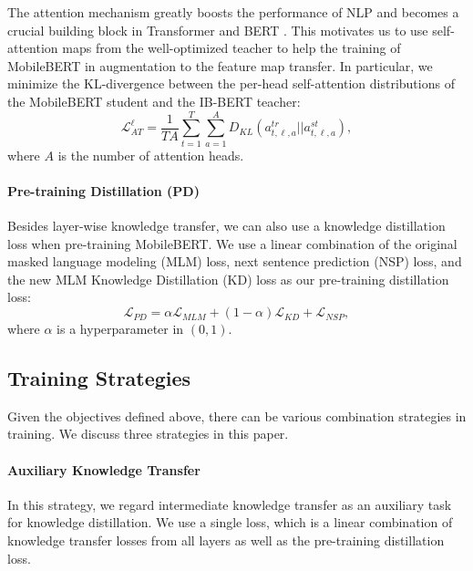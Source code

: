 \documentclass[11pt,a4paper]{article}
\begin{document}
The attention mechanism greatly boosts the performance of NLP and becomes a crucial building block in Transformer and BERT \citep{clark2019does,jawahar2019does}.
This motivates us to use self-attention maps from the well-optimized teacher to help the training of MobileBERT in augmentation to the feature map transfer.
In particular, we minimize the KL-divergence between the per-head self-attention distributions of the MobileBERT student and the IB-BERT teacher:
\begin{equation}
\mathcal{L}_{AT}^\ell = \frac{1}{TA}\sum_{t=1}^T\sum_{a=1}^A D_{KL}(a_{t,\ell,a}^{tr}||a_{t,\ell,a}^{st}),
\end{equation}
where $A$ is the number of attention heads.

\paragraph{Pre-training Distillation (PD)}

Besides layer-wise knowledge transfer, we can also use a knowledge distillation loss when pre-training MobileBERT.
We use a linear combination of the original masked language modeling (MLM) loss, next sentence prediction (NSP) loss, 
and the new MLM Knowledge Distillation (KD) loss as our pre-training distillation loss:
\begin{equation}
\mathcal{L}_{PD} = \alpha \mathcal{L}_{MLM} + (1 - \alpha) \mathcal{L}_{KD} + \mathcal{L}_{NSP},
\end{equation}
where $\alpha$ is a hyperparameter in $(0, 1)$.


\subsection{Training Strategies} \label{sec:bottom}

Given the objectives defined above, there can be various combination strategies in training. We discuss three strategies in this paper.

\paragraph{Auxiliary Knowledge Transfer}

In this strategy, we regard intermediate knowledge transfer as an auxiliary task for knowledge distillation. We use a single loss, which is a linear combination of knowledge transfer losses from all layers as well as the pre-training distillation loss.
\end{document}
